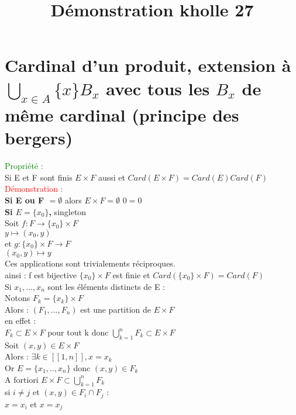 \documentclass{article}
\begin{document}
\title{Démonstration kholle 27}
\date{}
\maketitle
\renewcommand{\thesection}{\Roman{section}}
\setlength{\parindent}{1.5cm}
\section{Cardinal d'un produit, extension à $\bigcup_{x\in A} \lbrace x \rbrace B_x$ avec tous les $B_x$ de  même cardinal (principe des bergers)}
\textcolor{green}{Propriété :} \\
Si E et F sont finis $E \times F $ aussi et $Card(E \times F)= Card(E) Card(F)$ \\
\textcolor{red}{Démonstration :} \\
{\bf \boldmath Si E ou F $= \emptyset$} alors $E \times F= \emptyset$ $0=0$ \\
{\bf \boldmath Si $E= \lbrace x_0 \rbrace$,} singleton \\
Soit $f: F \rightarrow \lbrace x_0 \rbrace \times F $ \\
$y \mapsto (x_0,y)$ \\
et $g : \lbrace x_0 \rbrace \times F \rightarrow F$ \\
$(x_0,y) \mapsto y$ \\
Ces applications sont trivialements réciproques. \\
ainsi : f est bijective $\lbrace x_0 \rbrace \times F$ est finie et $Card(\lbrace x_0 \rbrace \times F)= Card(F) $ \\
Si $x_1,..., x_n$ sont les éléments distincts de E : \\
Notons $F_k= \lbrace x_k \rbrace \times F$ \\
Alors : $(F_1,...,F_n)$ est une partition de $E \times F$ \\
en effet : \\
$F_k \subset E \times F$ pour tout k donc $\bigcup_{k=1}^n F_k \subset E \times F$ \\
Soit $(x,y) \in E \times F$ \\
Alors : $\exists k \in [[1,n]],x=x_k$ \\
Or $E= \lbrace x_1,..,x_n \rbrace $ donc $(x,y) \in F_k$ \\
A fortiori  $E \times F \subset \bigcup_{k=1}^n F_k$ \\
si $i \neq j$ et $(x,y) \in F_i \cap F_j$ : \\
$x=x_i$ et $x=x_j$ \\
\end{document}
